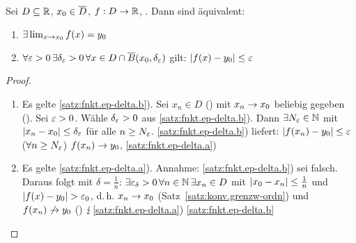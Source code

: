 \documentclass[12pt]{scrreprt}
\begin{document}
\begin{satz}\label{satz:fnkt.ep-delta}
Sei $D \subseteq \mathbb{R}$, $x_0\in\overline{D}$, $f: D \rightarrow \mathbb{R}$, . Dann sind äquivalent:
\begin{enumerate}
\item $\exists \lim_{x\rightarrow x_0} f(x) = y_0$ \label{satz:fnkt.ep-delta.a}
\item $\forall\varepsilon > 0\,\exists\delta_\varepsilon > 0\,\forall x\in D\cap \overline{B}(x_0, \delta_\varepsilon)$ gilt: $\left\lvert f(x) - y_0\right\lvert \le \varepsilon$ \label{satz:fnkt.ep-delta.b}
\end{enumerate}
\end{satz}
\begin{proof}
\begin{enumerate}
\item Es gelte \ref{satz:fnkt.ep-delta.b}). Sei $x_n\in D$ () mit $x_n \rightarrow x_0$ beliebig gegeben (\ninf). Sei $\varepsilon > 0$. Wähle $\delta_\varepsilon > 0$
aus \ref{satz:fnkt.ep-delta.b}). Dann $\exists N_\varepsilon \in\mathbb{N}$ mit $\left\lvert x_n - x_0\right\lvert \le \delta_\varepsilon$ für alle $n \ge N_\varepsilon$. \ref{satz:fnkt.ep-delta.b}) liefert:
$\left\lvert f(x_n) - y_0\right\lvert \le \varepsilon$ ($\forall n \ge N_\varepsilon$) \folgt $f(x_n) \rightarrow y_0$, \ninf{} \folgt \ref{satz:fnkt.ep-delta.a})
\item Es gelte \ref{satz:fnkt.ep-delta.a}). Annahme: \ref{satz:fnkt.ep-delta.b}) sei falsch. Daraus folgt mit $\delta = \frac{1}{n}$:
$\exists \varepsilon_\delta > 0\,\forall n\in\mathbb{N}\,\exists x_n \in D$ mit $\left\lvert x_0 - x_n\right\lvert \le \frac{1}{n}$ und $\left\lvert f(x) - y_0\right\lvert > \varepsilon_0$, 
d.\,h. $x_n \rightarrow x_0$ (Satz~\ref{satz:konv.grenzw-ordn}) und $f(x_n) \not\rightarrow y_0$ (\ninf) $\lightning$\ref{satz:fnkt.ep-delta.a}) \folgt \ref{satz:fnkt.ep-delta.b} %
\end{enumerate}
\end{proof}
\end{document}
